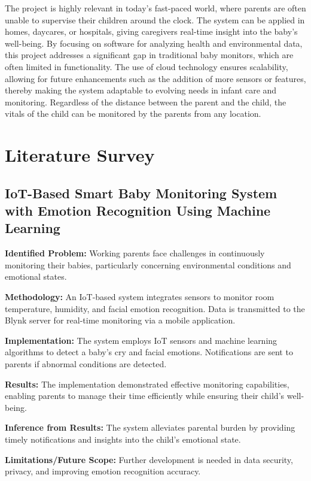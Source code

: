\documentclass[conference]{IEEEtran}
\begin{document}
The project is highly relevant in today’s fast-paced world, where parents are often unable to supervise their children around the clock. The system can be applied in homes, daycares, or hospitals, giving caregivers real-time insight into the baby’s well-being. By focusing on software for analyzing health and environmental data, this project addresses a significant gap in traditional baby monitors, which are often limited in functionality. The use of cloud technology ensures scalability, allowing for future enhancements such as the addition of more sensors or features, thereby making the system adaptable to evolving needs in infant care and monitoring. Regardless of the distance between the parent and the child, the vitals of the child can be monitored by the parents from any location.





\section{Literature Survey}

\subsection{IoT-Based Smart Baby Monitoring System with Emotion Recognition Using Machine Learning}
\textbf{Identified Problem:} Working parents face challenges in continuously monitoring their babies, particularly concerning environmental conditions and emotional states.

\textbf{Methodology:} An IoT-based system integrates sensors to monitor room temperature, humidity, and facial emotion recognition. Data is transmitted to the Blynk server for real-time monitoring via a mobile application.

\textbf{Implementation:} The system employs IoT sensors and machine learning algorithms to detect a baby’s cry and facial emotions. Notifications are sent to parents if abnormal conditions are detected.

\textbf{Results:} The implementation demonstrated effective monitoring capabilities, enabling parents to manage their time efficiently while ensuring their child’s well-being.

\textbf{Inference from Results:} The system alleviates parental burden by providing timely notifications and insights into the child’s emotional state.

\textbf{Limitations/Future Scope:} Further development is needed in data security, privacy, and improving emotion recognition accuracy.
\end{document}
